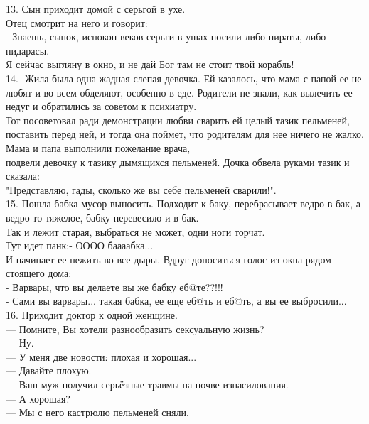 \documentclass[a4paper,20pt,notitlepage]{extbook}
\begin{document}
	13. Сын приходит домой с серьгой в ухе.\\
	 Отец смотрит на него и говорит:\\
	- Знаешь, сынок, испокон веков серьги в ушах носили либо пираты, либо пидарасы. \\
	Я сейчас выгляну в окно, и не дай Бог там не стоит твой корабль!\\
	
	14. -Жила-была одна жадная слепая девочка. Ей казалось, что мама с папой ее не любят
	и во всем обделяют, особенно в еде.
	 Родители не знали, как вылечить ее недуг
	и обратились за советом к психиатру. \\
	Тот посоветовал ради демонстрации любви сварить ей целый тазик пельменей,\\
	поставить перед ней, и тогда она поймет, что родителям для нее ничего не жалко.\\
	Мама и папа выполнили пожелание врача,\\
	подвели девочку к тазику дымящихся пельменей. 
	Дочка обвела руками тазик и сказала:\\
	"Представляю, гады, сколько же вы себе пельменей сварили!".\\
	
	15. Пошла бабка мусор выносить. Подходит к баку, перебрасывает ведро в бак, а ведро-то тяжелое, бабку перевесило и в бак.\\
	 Так и лежит старая, выбраться не может, одни ноги торчат.\\
	  Тут идет панк:- ОООО баааабка...\\
	И начинает ее пежить во все дыры. Вдруг доноситься голос из окна рядом стоящего дома:\\
	- Варвары, что вы делаете вы же бабку еб@те??!!!\\
	- Сами вы варвары... такая бабка, ее еще еб@ть и еб@ть, а вы ее выбросили...\\
	
	16. Приходит доктор к одной женщине.\\
	— Помните, Вы хотели разнообразить сексуальную жизнь?\\
	— Ну.\\
	— У меня две новости: плохая и хорошая...\\
	— Давайте плохую.\\
	— Ваш муж получил серьёзные травмы на почве изнасилования.\\
	— А хорошая?\\
	— Мы с него кастрюлю пельменей сняли.\\
	
\end{document}
